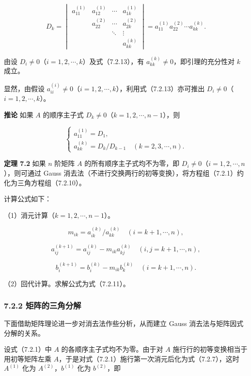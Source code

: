 \documentclass[
  10pt,
  fontset=fandol]{ctexart}
\begin{document}
\[
D_k=\begin{vmatrix}
a_{11}^{(1)}&a_{12}^{(1)}&\cdots&a_{1k}^{(1)}\\
&a_{22}^{(2)}&\cdots&a_{2k}^{(2)}\\
&&\ddots&\vdots\\
&&&a_{kk}^{(k)}
\end{vmatrix}
=a_{11}^{(1)}a_{22}^{(2)}\cdots a_{kk}^{(k)}.
\tag{7.2.13}
\]

由设 \(D_i\ne0\)（\(i=1,2,\cdots,k\)）及式（7.2.13），有 \(a_{kk}^{(k)}\ne0\)，即引理的充分性对 \(k\) 成立。

显然，由假设 \(a_{ii}^{(i)}\ne0\)（\(i=1,2,\cdots,k\)），利用式（7.2.13）亦可推出 \(D_i\ne0\)（\(i=1,2,\cdots,k\)）。

\textbf{推论} 如果 \(A\) 的顺序主子式 \(D_k\ne0\)（\(k=1,2,\cdots,n-1\)），则

\[
\begin{cases}
a_{11}^{(1)}=D_1,\\
a_{kk}^{(k)}=D_k/D_{k-1}\quad(k=2,3,\cdots,n).
\end{cases}
\]

\textbf{定理 7.2} 如果 \(n\) 阶矩阵 \(A\) 的所有顺序主子式均不为零，即 \(D_i\ne0\)（\(i=1,2,\cdots,n\)），则可通过 Gauss 消去法（不进行交换两行的初等变换），将方程组（7.2.1）约化为三角方程组（7.2.10）。

计算公式如下：

（1）消元计算（\(k=1,2,\cdots,n-1\)）。

\[m_{ik}=a_{ik}^{(k)}/a_{kk}^{(k)}\quad(i=k+1,\cdots,n),\]

\[a_{ij}^{(k+1)}=a_{ij}^{(k)}-m_{ik}a_{kj}^{(k)}\quad(i,j=k+1,\cdots,n),\]

\[b_i^{(k+1)}=b_i^{(k)}-m_{ik}b_k^{(k)}\quad(i=k+1,\cdots,n).\]

（2）回代计算。求解公式为式（7.2.11）。

\subsubsection{7.2.2 矩阵的三角分解}\label{ux77e9ux9635ux7684ux4e09ux89d2ux5206ux89e3}

下面借助矩阵理论进一步对消去法作些分析，从而建立 Gauss 消去法与矩阵因式分解的关系。

设式（7.2.1）中 \(A\) 的各顺序主子式均不为零。由于对 \(A\) 施行行的初等变换相当于用初等矩阵左乘 \(A\)，于是对式（7.2.1）施行第一次消元后化为式（7.2.7），这时 \(A^{(1)}\) 化为 \(A^{(2)}\)，\(b^{(1)}\) 化为 \(b^{(2)}\)，即
\end{document}

